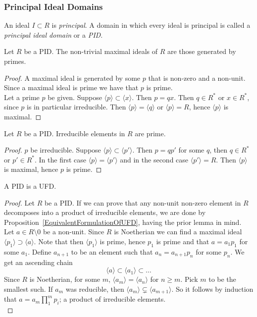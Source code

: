 \subsubsection{Principal Ideal Domains}
    \begin{definition}
        An ideal $I\subset R$ is \textit{principal}. A domain in which every ideal is principal is called a \textit{principal ideal domain} or a \textit{PID}. 
    \end{definition}
    \begin{lemma}\label{InPIDPrimeIdealsAreMaximal}
        Let $R$ be a PID. The non-trivial maximal ideals of $R$ are those generated by primes.
    \end{lemma}
    \begin{proof}
        A maximal ideal is generated by some $p$ that is non-zero and a non-unit. Since a maximal ideal is prime we have that $p$ is prime.\\
        Let a prime $p$ be given. Suppose $\langle p\rangle \subset \langle x\rangle$. Then $p=qx$. Then $q\in R^\ast$ or $x\in R^\ast$, since $p$ is in particular irreducible. Then $\langle p\rangle = \langle q\rangle$ or $\langle p\rangle = R$, hence $\langle p\rangle$ is maximal. 
    \end{proof}
    \begin{lemma}\label{InPIDIrreduciblesArePrimes}
        Let $R$ be a PID. Irreducible elements in $R$ are prime. 
    \end{lemma}
    \begin{proof}
         $p$ be irreducible. Suppose $\langle p\rangle \subset \langle p'\rangle$. Then $p = qp'$ for some $q$, then $q\in R^\ast$ or $p'\in R^\ast$. In the first case $\langle p \rangle = \langle p'\rangle$ and in the second case $\langle p'\rangle = R$. 
        Then $\langle p \rangle$ is maximal, hence $p$ is prime. 
    \end{proof}
    \begin{lemma}
        A PID is a UFD.
    \end{lemma}
    \begin{proof}
        Let $R$ be a PID. If we can prove that any non-unit non-zero element in $R$ decomposes into a product of irreducible elements, we are done by  Proposition~\ref{EquivalentFormulationOfUFD}, having the prior lemma in mind. Let $a\in R\setminus 0$ be a non-unit. Since $R$ is Noetherian we can find a maximal ideal $\langle p_1\rangle \supset \langle a\rangle$. Note that then $\langle p_1\rangle$ is prime, hence $p_1$ is prime and that $a=a_1p_1$ for some $a_1$. Define $a_{n+1}$ to be an element such that $a_n=a_{n+1}p_n$ for some $p_n$. We get an ascending chain 
        $$\langle a\rangle \subset \langle a_1\rangle \subset \dots$$
        Since $R$ is Noetherian, for some $m$, $\langle a_m\rangle=\langle a_n\rangle $ for $n\geq m$. Pick $m$ to be the smallest such. If $a_m$ was reducible, then $\langle a_m\rangle \subsetneq \langle a_{m+1}\rangle$. So it follows by induction that $a = a_m\prod_1^m p_i$; a product of irreducible elements.\\
    \end{proof}
